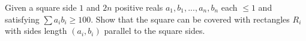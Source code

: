 Given a square side $1$ and $2n$ positive reals $a_1, b_1, ... , a_n, b_n$ each  $\le  1$ and satisfying  $\sum a_ib_i \ge  100$. Show that the square can be covered with rectangles $R_i$ with sides length $(a_i, b_i)$ parallel to the square sides.